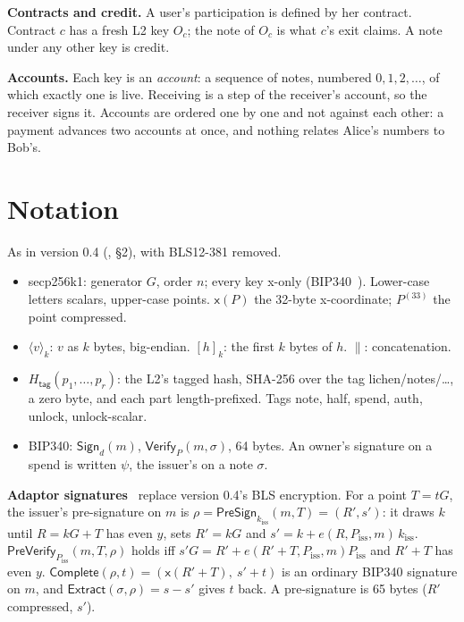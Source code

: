 \documentclass[11pt]{article}
\theoremstyle{plain}
\theoremstyle{definition}
\newcommand{\be}[2]{\langle #1\rangle_{#2}}
\newcommand{\pre}[2]{[#1]_{#2}}
\newcommand{\xo}[1]{\mathsf{x}(#1)}
\newcommand{\Ht}[1]{H_{\textsf{#1}}}
\newcommand{\Sign}{\mathsf{Sign}}
\newcommand{\Vfy}{\mathsf{Verify}}
\newcommand{\PSign}{\mathsf{PreSign}}
\newcommand{\PVfy}{\mathsf{PreVerify}}
\newcommand{\Compl}{\mathsf{Complete}}
\newcommand{\Extr}{\mathsf{Extract}}
\newcommand{\kiss}{k_{\mathrm{iss}}}
\newcommand{\Piss}{P_{\mathrm{iss}}}
\newcommand{\Oc}{O_c}
\begin{document}
\textbf{Contracts and credit.} A user's participation is defined by her
contract. Contract $c$ has a fresh L2 key $\Oc$; the note of $\Oc$ is
what $c$'s exit claims. A note under any other key is credit.

\textbf{Accounts.} Each key is an \emph{account}: a sequence of notes,
numbered $0, 1, 2, \dots$, of which exactly one is live. Receiving is a
step of the receiver's account, so the receiver signs it. Accounts are
ordered one by one and not against each other: a payment advances two
accounts at once, and nothing relates Alice's numbers to Bob's.

\section{Notation}\label{sec:notation}

As in version 0.4 (\cite{grants04}, \S2), with BLS12-381 removed.

\begin{itemize}[nosep]
\item secp256k1: generator $G$, order $n$; every key x-only
  (BIP340~\cite{bip340}). Lower-case letters scalars, upper-case points.
  $\xo{P}$ the 32-byte x-coordinate; $P^{(33)}$ the point compressed.
\item $\be{v}{k}$: $v$ as $k$ bytes, big-endian. $\pre{h}{k}$: the first
  $k$ bytes of $h$. $\|$: concatenation.
\item $\Ht{tag}(p_1, \dots, p_r)$: the L2's tagged hash, SHA-256 over the
  tag \textsf{lichen/notes/\ldots}, a zero byte, and each part
  length-prefixed. Tags \textsf{note}, \textsf{half}, \textsf{spend},
  \textsf{auth}, \textsf{unlock}, \textsf{unlock-scalar}.
\item BIP340: $\Sign_d(m)$, $\Vfy_P(m, \sigma)$, 64 bytes. An owner's
  signature on a spend is written $\psi$, the issuer's on a note
  $\sigma$.
\end{itemize}

\textbf{Adaptor signatures}~\cite{poelstra,aumayr} replace version 0.4's
BLS encryption. For a point $T = tG$, the issuer's pre-signature on $m$
is $\rho = \PSign_{\kiss}(m, T) = (R', s')$: it draws $k$ until $R = kG
+ T$ has even $y$, sets $R' = kG$ and $s' = k + e(R, \Piss, m)\,\kiss$.
$\PVfy_{\Piss}(m, T, \rho)$ holds iff $s'G = R' + e(R' + T, \Piss,
m)\Piss$ and $R' + T$ has even $y$. $\Compl(\rho, t) = (\xo{R' + T},\ s'
+ t)$ is an ordinary BIP340 signature on $m$, and $\Extr(\sigma, \rho) =
s - s'$ gives $t$ back. A pre-signature is 65 bytes ($R'$ compressed,
$s'$).
\end{document}
